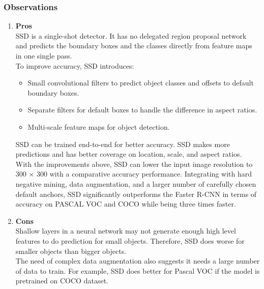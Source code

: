         \subsubsection{Observations}
            \begin{enumerate}
                \item \textbf{Pros} \\ 
                    \vspace{3mm}
                    SSD is a single-shot detector. It has no delegated region proposal network and predicts the boundary boxes and the classes directly from feature maps in one single pass. \\ 
                    \vspace{3mm}
                    To improve accuracy, SSD introduces:
                    \begin{itemize}
                        \item Small convolutional filters to predict object classes and offsets to default boundary boxes.
                        \item Separate filters for default boxes to handle the difference in aspect ratios.
                        \item Multi-scale feature maps for object detection.
                    \end{itemize}
                    \vspace{3mm}
                    SSD can be trained end-to-end for better accuracy. SSD makes more predictions and has better coverage on location, scale, and aspect ratios. With the improvements above, SSD can lower the input image resolution to 300 × 300 with a comparative accuracy performance. Integrating with hard negative mining, data augmentation, and a larger number of carefully chosen default anchors, SSD significantly outperforms the Faster R-CNN in terms of accuracy on PASCAL VOC and COCO while being three times faster.
                \item \textbf{Cons} \\ 
                Shallow layers in a neural network may not generate enough high level features to do prediction for small objects. Therefore, SSD does worse for smaller objects than bigger objects. \\ 
                \vspace{3mm}
                The need of complex data augmentation also suggests it needs a large number of data to train. For example, SSD does better for Pascal VOC if the model is pretrained on COCO dataset.
            \end{enumerate}

